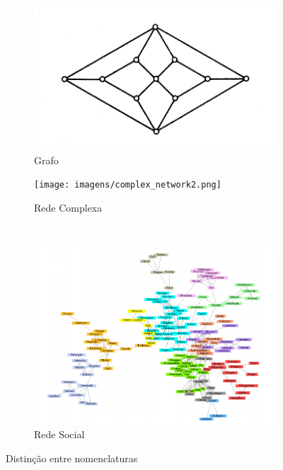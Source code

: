 \begin{figure}[ht]
    \centering
    \begin{subfigure}{0.36\textwidth}
        \includegraphics[width=\linewidth]{imagens/generic_graph.png}
        \caption{Grafo} \label{fig:1a}
    \end{subfigure}
    \vspace*{0.2cm}
    \begin{subfigure}{0.31\textwidth}
        \texttt{[image: imagens/complex\_network2.png]}
        \caption{Rede Complexa} \label{fig:1b}
    \end{subfigure}
    \\
    \begin{subfigure}{0.54\textwidth}
        \includegraphics[width=\linewidth]{imagens/collaboration_network.png}
        \caption{Rede Social} \label{fig:1c}
    \end{subfigure}
    \vspace*{0.3cm}
    \caption{Distinção entre nomenclaturas}
    \label{fig:networknomenclature}
\end{figure}

